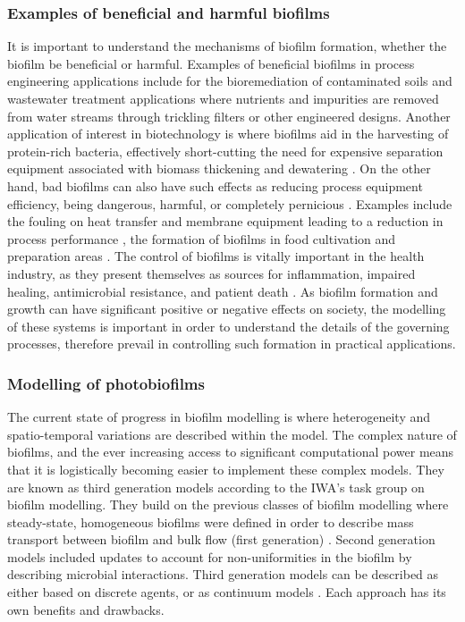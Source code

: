 \subsubsection{Examples of beneficial and harmful biofilms}
It is important to understand the mechanisms of biofilm formation, whether the biofilm be beneficial or harmful. Examples of beneficial biofilms in process engineering applications include for the bioremediation of contaminated soils \cite{singh2006} and wastewater treatment applications where nutrients and impurities are removed from water streams through trickling filters or other engineered designs. Another application of interest in biotechnology is where biofilms aid in the harvesting of protein-rich bacteria, effectively short-cutting the need for expensive separation equipment associated with biomass thickening and dewatering \cite{hulsen2016a}.
\skippingparagraph
On the other hand, bad biofilms can also have such effects as reducing process equipment efficiency, being dangerous, harmful, or completely pernicious \cite{donlan2002}. Examples include the fouling on heat transfer and membrane equipment leading to a reduction in process performance \cite{mcdonogh1994}, the formation of biofilms in food cultivation and preparation areas \cite{wirtanen2003}. The control of biofilms is vitally important in the health industry, as they present themselves as sources for inflammation, impaired healing, antimicrobial resistance, and patient death \cite{bryers2008}. As biofilm formation and growth can have significant positive or negative effects on society, the modelling of these systems is important in order to understand the details of the governing processes, therefore prevail in controlling such formation in practical applications. 


\subsubsection{Modelling of photobiofilms}
The current state of progress in biofilm modelling is where heterogeneity and spatio-temporal variations are described within the model. The complex nature of biofilms, and the ever increasing access to significant computational power means that it is logistically becoming easier to implement these complex models. They are known as third generation models according to the IWA's task group on biofilm modelling. They build on the previous classes of biofilm modelling where steady-state, homogeneous biofilms were defined in order to describe mass transport between biofilm and bulk flow (first generation) \cite{wanner2006}. Second generation models included updates to account for non-uniformities in the biofilm by describing microbial interactions. Third generation models can be described as either based on discrete agents, or as continuum models \cite{dacunto2017}. Each approach has its own benefits and drawbacks.

